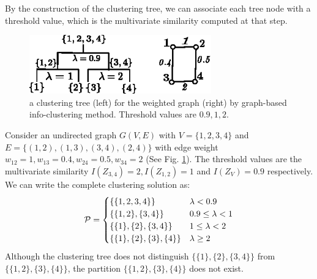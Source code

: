 By the construction of the clustering tree, we can associate each tree node with a threshold value, which is the multivariate similarity computed at that step.
\begin{example}
\begin{figure}
\centering
\includegraphics[width=0.7\textwidth]{threshold.eps}
\caption{a clustering tree (left) for the weighted graph (right) by graph-based info-clustering method. Threshold values are $0.9, 1, 2$.}\label{fig:threshold}
\end{figure}
Consider an undirected graph $G(V, E)$ with $V=\{1,2,3,4\}$ and $E=\{(1,2),(1,3),(3,4),(2,4)\}$ with edge weight $w_{12}=1,w_{13}=0.4,w_{24}=0.5,w_{34}=2$ (See Fig. \ref{fig:threshold}). The threshold values are the multivariate similarity $I(Z_{3,4})=2, I(Z_{1,2})=1$ and $I(Z_V)=0.9$ respectively. We can write the complete clustering solution as:
\begin{equation*}
\P = 
\begin{cases}
\{\{1,2,3,4\}\} & \lambda < 0.9 \\
\{\{1,2\},\{3,4\}\} & 0.9 \leq \lambda < 1 \\
\{\{1\},\{2\},\{3,4\}\} & 1 \leq \lambda < 2\\
\{\{1\},\{2\},\{3\},\{4\}\} & \lambda \geq 2
\end{cases}
\end{equation*}
Although the clustering tree does not distinguish $\{\{1\},\{2\},\{3,4\}\}$ from $\{\{1,2\},\{3\}, \{4\}\}$, the partition $\{\{1,2\},\{3\}, \{4\}\}$ does not exist.
\end{example}

